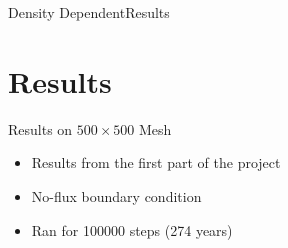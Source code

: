 \documentclass{beamer}
\begin{document}
\begin{frame}{Density Dependent}{Results}
    \begin{center}
    \end{center}
\end{frame}

\section{Results}

\begin{frame}{Results on $500 \times 500$ Mesh}
    \begin{itemize}
        \item Results from the first part of the project
        \item No-flux boundary condition
        \item Ran for 100000 steps (274 years)
    \end{itemize}
\end{frame}
\end{document}
